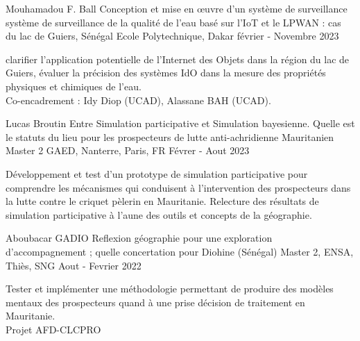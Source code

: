 \begin{cventries}
    \cventry
        {Mouhamadou F. Ball} %
        {Conception et mise en œuvre d'un système de surveillance système de surveillance de la qualité de l'eau basé sur l'IoT et le LPWAN : cas du lac de Guiers, Sénégal} %
        {Ecole Polytechnique, Dakar} %
        {février - Novembre 2023} %
        {
        \begin{cvitems} %
          clarifier l'application potentielle de l'Internet des Objets dans la région du lac de Guiers, évaluer la précision des systèmes IdO dans la mesure des propriétés physiques et chimiques de l'eau.\\
            Co-encadrement : Idy Diop (UCAD), Alassane BAH (UCAD).
        \end{cvitems}
        }


    \cventry
        {Lucas Broutin} %
        {Entre Simulation participative et Simulation bayesienne. Quelle est le statuts du lieu pour les prospecteurs de lutte anti-achridienne Mauritanien} %
        {Master 2 GAED, Nanterre, Paris, FR} %
        {Févrer - Aout 2023} %
        {
        \begin{cvitems} %
          Développement et test d'un prototype de simulation participative pour comprendre les mécanismes qui conduisent à l'intervention des prospecteurs dans la lutte contre le criquet pèlerin en Mauritanie. Relecture des résultats de simulation participative à l'aune des outils et concepts de la géographie.
        \end{cvitems}
        }


    \cventry
        {Aboubacar GADIO} %
        {Reflexion géographie pour une exploration d'accompagnement ; quelle concertation pour Diohine (Sénégal)} %
        {Master 2, ENSA, Thiès, SNG} %
        {Aout - Fevrier 2022} %
        {
        \begin{cvitems} %
            Tester et implémenter une méthodologie permettant de produire des modèles mentaux des prospecteurs quand à une prise décision de traitement en Mauritanie.\\
            Projet AFD-CLCPRO
        \end{cvitems}
        }



\end{cventries}
